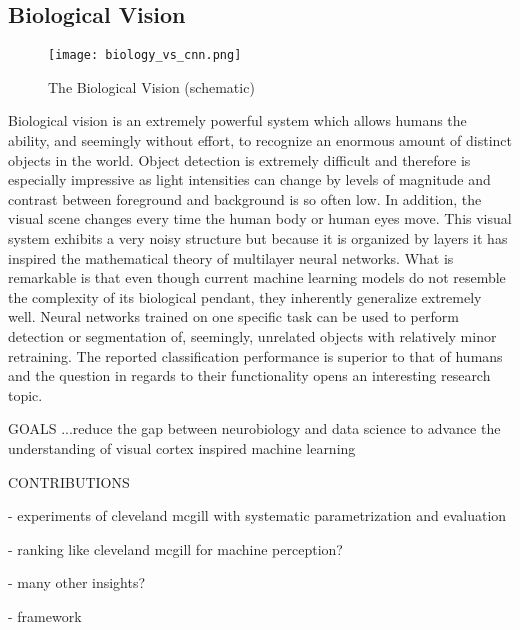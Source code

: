 \subsection{Biological Vision}

\begin{figure}[t]
	  \texttt{[image: biology\_vs\_cnn.png]}
  \caption{The Biological Vision (schematic)}
	\label{fig:vision}
\end{figure}

Biological vision is an extremely powerful system which allows humans the ability, and seemingly without effort, to recognize an enormous amount of distinct objects in the world. 
Object detection is extremely difficult and therefore is especially impressive as light intensities can change by levels of magnitude and contrast between foreground and background is so often low. 
In addition, the visual scene changes every time the human body or human eyes move. 
This visual system exhibits a very noisy structure but because it is organized by layers it has inspired the mathematical theory of multilayer neural networks. 
What is remarkable is that even though current machine learning models do not resemble the complexity of its biological pendant, they inherently generalize extremely well. 
Neural networks trained on one specific task can be used to perform detection or segmentation of, seemingly, unrelated objects with relatively minor retraining. 
The reported classification performance is superior to that of humans and the question in regards to their functionality opens an interesting research topic.


GOALS
...reduce the gap between neurobiology and data science to advance the understanding of visual cortex inspired machine learning

CONTRIBUTIONS

- experiments of cleveland mcgill with systematic parametrization and evaluation

- ranking like cleveland mcgill for machine perception?

- many other insights?

- framework



